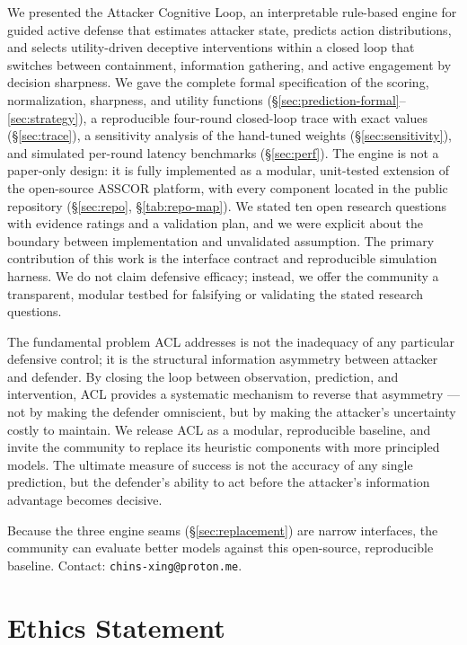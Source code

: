 \documentclass[11pt]{article}
\begin{document}
We presented the Attacker Cognitive Loop, an interpretable rule-based engine
for guided active defense that estimates attacker state, predicts action
distributions, and selects utility-driven deceptive interventions within a
closed loop that switches between containment, information gathering, and
active engagement by decision sharpness. We gave the complete formal
specification of the scoring, normalization, sharpness, and utility
functions (\S\ref{sec:prediction-formal}--\ref{sec:strategy}), a
reproducible four-round closed-loop trace with exact values
(\S\ref{sec:trace}), a sensitivity analysis of the hand-tuned weights
(\S\ref{sec:sensitivity}), and simulated per-round latency benchmarks
(\S\ref{sec:perf}). The engine is not a paper-only design: it is fully
implemented as a modular, unit-tested extension of the open-source ASSCOR
platform, with every component located in the public repository
(\S\ref{sec:repo}, \S\ref{tab:repo-map}). We stated ten open
research questions with evidence ratings and a validation plan, and we were
explicit about the boundary between implementation and unvalidated
assumption. The primary contribution of this work is the interface contract
and reproducible simulation harness. We do not claim defensive efficacy;
instead, we offer the community a transparent, modular testbed for
falsifying or validating the stated research questions.

The fundamental problem ACL addresses is not the inadequacy of any particular defensive control; it is the structural information asymmetry between attacker and defender. By closing the loop between observation, prediction, and intervention, ACL provides a systematic mechanism to reverse that asymmetry --- not by making the defender omniscient, but by making the attacker's uncertainty costly to maintain. We release ACL as a modular, reproducible baseline, and invite the community to replace its heuristic components with more principled models. The ultimate measure of success is not the accuracy of any single prediction, but the defender's ability to act before the attacker's information advantage becomes decisive.

Because the three engine seams (\S\ref{sec:replacement}) are narrow interfaces, the community can evaluate better models against this open-source, reproducible baseline. Contact: \texttt{chins-xing@proton.me}.

\section*{Ethics Statement}
\end{document}
